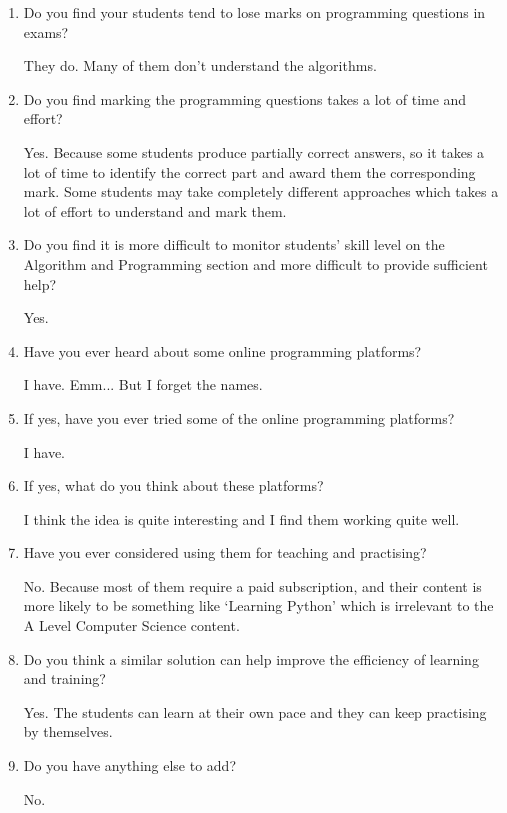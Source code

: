 \documentclass[a4paper]{report}
\begin{document}
\begin{enumerate}
    \item Do you find your students tend to lose marks on programming questions in exams?

    They do. Many of them don't understand the algorithms.

    \item Do you find marking the programming questions takes a lot of time and effort?

    Yes. Because some students produce partially correct answers, so it takes a lot of time to identify the correct part and award them the corresponding mark. Some students may take completely different approaches which takes a lot of effort to understand and mark them.

    \item Do you find it is more difficult to monitor students' skill level on the Algorithm and Programming section and more difficult to provide sufficient help?

    Yes.

    \item Have you ever heard about some online programming platforms?

    I have. Emm... But I forget the names.

    \item If yes, have you ever tried some of the online programming platforms?

    I have.

    \item If yes, what do you think about these platforms?

    I think the idea is quite interesting and I find them working quite well.

    \item Have you ever considered using them for teaching and practising?

    No. Because most of them require a paid subscription, and their content is more likely to be something like `Learning Python' which is irrelevant to the A Level Computer Science content.

    \item Do you think a similar solution can help improve the efficiency of learning and training?

    Yes. The students can learn at their own pace and they can keep practising by themselves.

    \item Do you have anything else to add?

    No.
\end{enumerate}
\end{document}
